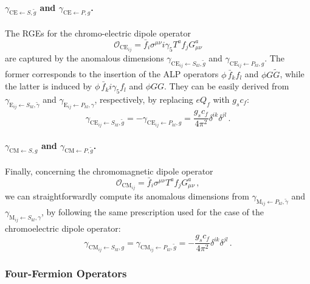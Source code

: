 \paragraph{\texorpdfstring{$\gamma_{\mathrm{CE}\leftarrow S,\tilde g}$ and $\gamma_{\mathrm{CE}\leftarrow P, g}$}{gamma CE from S, gtilde and P, g}.}
The RGEs for the chromo-electric dipole operator
\begin{equation}
    \mathcal O_{\text{CE}_{ij}} = \bar f_i \sigma^{\mu\nu}i\gamma_5 T^a f_j G_{\mu\nu}^a
\end{equation}
are captured by the anomalous dimensions
$\gamma_{\text{CE}_{ij}\leftarrow S_{kl},\tilde g}$ and
$\gamma_{\text{CE}_{ij}\leftarrow P_{kl}, g}$.
The former corresponds to the insertion of the ALP operators $\phi\, \bar f_k f_l$ and
$\phi G\widetilde G$, while the latter is induced by
$\phi\, \bar f_k i \gamma_5 f_l$ and $\phi G G$.
They can be easily derived from $\gamma_{\text{E}_{ij}\leftarrow S_{kl},\tilde \gamma}$ and
$\gamma_{\text{E}_{ij}\leftarrow P_{kl}, \gamma}$, respectively, by replacing $eQ_f$ with
$g_s c_f$:
\begin{equation}
    \gamma_{\text{CE}_{ij}\leftarrow S_{kl},\tilde g} =- \gamma_{\text{CE}_{ij}\leftarrow P_{kl}, g}=  \frac{g_sc_f }{4\pi^2}\delta^{ik}\delta^{jl}\,.
\end{equation}

\paragraph{\texorpdfstring{$\gamma_{\mathrm{CM}\leftarrow S, g}$ and $\gamma_{\mathrm{CM}\leftarrow P,\tilde g}$}{gamma CM from S, g and P, gtilde}.}
Finally, concerning the chromomagnetic dipole operator
\begin{equation}
    \mathcal O_{\text{CM}_{ij}} = \bar f_i \sigma^{\mu\nu} T^a f_j G_{\mu\nu}^a\,,
\end{equation}
we can straightforwardly compute its anomalous dimensions from
$\gamma_{\text{M}_{ij}\leftarrow P_{kl},\tilde\gamma}$ and
$\gamma_{\text{M}_{ij}\leftarrow S_{kl},\gamma}$, by following the same prescription used for
the case of the chromoelectric dipole operator:
\begin{equation}
    \gamma_{\text{CM}_{ij}\leftarrow S_{kl}, g}=\gamma_{\text{CM}_{ij}\leftarrow P_{kl},\tilde g}= -\frac{g_sc_f }{4\pi^2}\delta^{ik}\delta^{jl}\,.
\end{equation}

\subsubsection{Four-Fermion Operators}
\label{sec:ALPLEFT4f}

